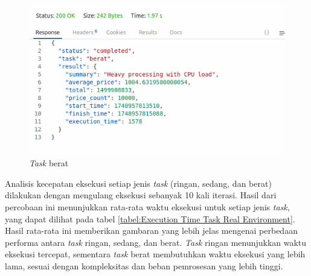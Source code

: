 \begin{figure} [H]
    \centering
    \includegraphics[width=0.75\linewidth]{gambar/Task Berat.png}
    \caption{\textit{Task} berat}
    \label{figure:Task Berat}
\end{figure}

Analisis kecepatan eksekusi setiap jenis \textit{task} (ringan, sedang, dan berat) dilakukan dengan mengulang eksekusi sebanyak 10 kali iterasi. Hasil dari percobaan ini menunjukkan rata-rata waktu eksekusi untuk setiap jenis \textit{task}, yang dapat dilihat pada tabel \ref{tabel:Execution Time Task Real Environment}. Hasil rata-rata ini memberikan gambaran yang lebih jelas mengenai perbedaan performa antara \textit{task} ringan, sedang, dan berat. \textit{Task} ringan menunjukkan waktu eksekusi tercepat, sementara \textit{task} berat membutuhkan waktu eksekusi yang lebih lama, sesuai dengan kompleksitas dan beban pemrosesan yang lebih tinggi.

\newpage

